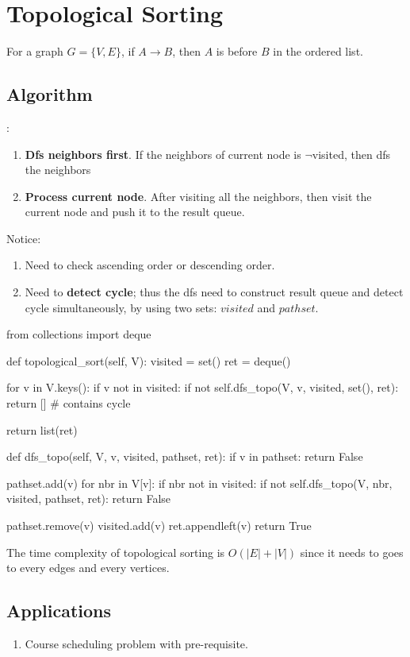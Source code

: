 \section{Topological Sorting}
For a graph $G=\{V, E\}$, if $A \rightarrow B $, then $A$ is before $B$ in the ordered list.
\subsection{Algorithm}
:
\begin{enumerate}
\item \textbf{Dfs neighbors first}. If the neighbors of current node is  $\neg$visited, then dfs the neighbors
\item \textbf{Process current node}. After visiting all the neighbors, then visit the current node and push it to the result queue.

\end{enumerate}
Notice:
\begin{enumerate}
\item Need to check ascending order or descending order.
\item Need to \textbf{detect cycle}; thus the dfs need to construct result queue and detect cycle simultaneously, by using two sets: $visited$ and $pathset$.
\end{enumerate}
\newpage
\begin{python}
from collections import deque

def topological_sort(self, V):
  visited = set()
  ret = deque()

  for v in V.keys():
    if v not in visited:
      if not self.dfs_topo(V, v, visited, set(), ret):
        return []  # contains cycle

  return list(ret)

def dfs_topo(self, V, v, visited, pathset, ret):
  if v in pathset:
    return False

  pathset.add(v)
  for nbr in V[v]:
    if nbr not in visited:
      if not self.dfs_topo(V, nbr, visited, pathset, ret):
        return False

  pathset.remove(v)
  visited.add(v)
  ret.appendleft(v)
  return True

\end{python}
The time complexity of topological sorting is $O(|E|+|V|)$ since it needs to goes to every edges and every vertices. 

\subsection{Applications}
\begin{enumerate}
\item Course scheduling problem with pre-requisite.
\end{enumerate}

